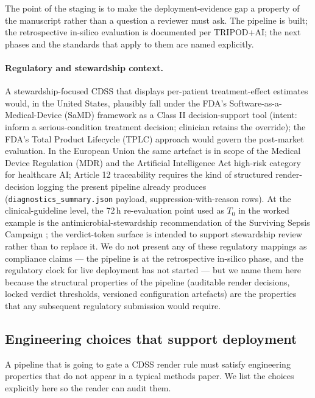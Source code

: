\documentclass[11pt,a4paper]{article}
\begin{document}
The point of the staging is to make the deployment-evidence gap a property of the manuscript rather than a question a reviewer must ask. The pipeline is built; the retrospective in-silico evaluation is documented per TRIPOD+AI; the next phases and the standards that apply to them are named explicitly.

\paragraph{Regulatory and stewardship context.} A stewardship-focused CDSS that displays per-patient treatment-effect estimates would, in the United States, plausibly fall under the FDA's Software-as-a-Medical-Device (SaMD) framework as a Class II decision-support tool (intent: inform a serious-condition treatment decision; clinician retains the override); the FDA's Total Product Lifecycle (TPLC) approach would govern the post-market evaluation. In the European Union the same artefact is in scope of the Medical Device Regulation (MDR) and the Artificial Intelligence Act high-risk category for healthcare AI; Article 12 traceability requires the kind of structured render-decision logging the present pipeline already produces (\texttt{diagnostics\_summary.json} payload, suppression-with-reason rows). At the clinical-guideline level, the 72\,h re-evaluation point used as $T_0$ in the worked example is the antimicrobial-stewardship recommendation of the Surviving Sepsis Campaign \cite{evans2021surviving}; the verdict-token surface is intended to support stewardship review rather than to replace it. We do not present any of these regulatory mappings as compliance claims --- the pipeline is at the retrospective in-silico phase, and the regulatory clock for live deployment has not started --- but we name them here because the structural properties of the pipeline (auditable render decisions, locked verdict thresholds, versioned configuration artefacts) are the properties that any subsequent regulatory submission would require.

\subsection{Engineering choices that support deployment}\label{sec:engineering}

A pipeline that is going to gate a CDSS render rule must satisfy engineering properties that do not appear in a typical methods paper. We list the choices explicitly here so the reader can audit them.
\end{document}
